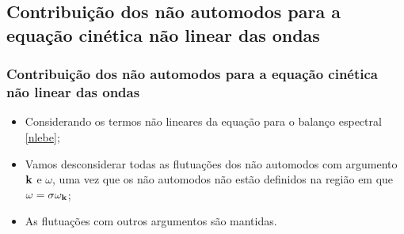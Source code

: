 \documentclass[10pt,aspectratio=1610,lualatex]{beamer}
\begin{document}
\subsection{Contribuição dos não automodos para a equação
  cinética  não linear das ondas}
\begin{frame}
  \frametitle{Contribuição dos não automodos para a equação cinética
    não linear das ondas}
  \begin{itemize}
    \item Considerando os termos não lineares da equação para o balanço
    espectral \eqref{nlebe};
    \vspace{0.4cm}
    \pause
    \item Vamos desconsiderar todas as flutuações dos não automodos
    com argumento ${\bf k}$ e $\omega$, uma vez que os não automodos
    não estão definidos na região em que $\omega=\sigma \omega_{\bf k}$;
    \vspace{0.4cm}
    \pause
    \item As flutuações com outros argumentos são  mantidas.
  \end{itemize}
\end{frame}
\end{document}
